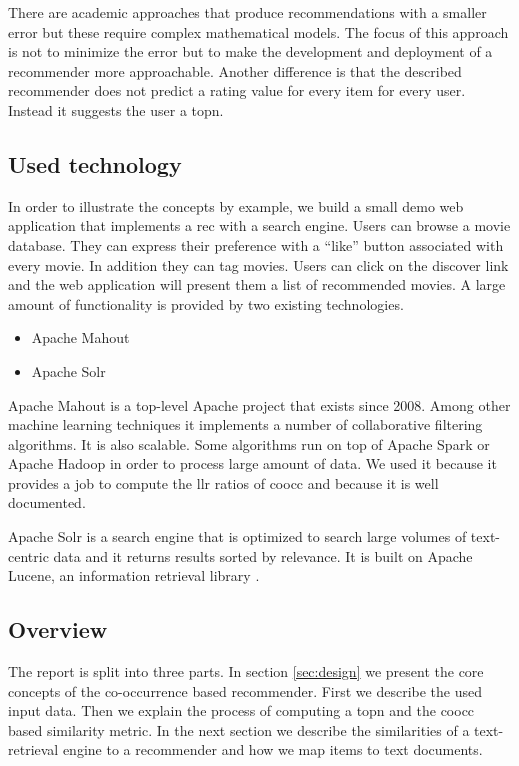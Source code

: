 There are academic approaches that produce recommendations with a smaller error but these require complex mathematical models. The focus of this approach is not to minimize the error but to make the development and deployment of a recommender more approachable. Another difference is that the described recommender does not predict a rating value for every item for every user. Instead it suggests the user a \gls{topn}.


\subsection{Used technology}
\label{sec:tech}

In order to illustrate the concepts by example, we build a small demo web application that implements a \gls{rec} with a search engine. Users can browse a movie database. They can express their preference with a ``like'' button associated with every movie. In addition they can tag movies. Users can click on the discover link and the web application will present them a list of recommended movies. A large amount of functionality is provided by two existing technologies.

\begin{itemize}
\item Apache Mahout
\item Apache Solr
\end{itemize}

Apache Mahout is a top-level Apache project that exists since 2008. Among other machine learning techniques it implements a number of collaborative filtering algorithms. It is also \gls{scalable}. Some algorithms run on top of Apache Spark or Apache Hadoop in order to process large amount of data\cite{Owen}. We used it because it provides a job to compute the \gls{llr} ratios of \gls{coocc} and because it is well documented.

Apache Solr is a search engine that is optimized to search large volumes of text-centric data and it returns results sorted by relevance. It is built on Apache Lucene, an information retrieval library \cite{grainger}.

\subsection{Overview}
The report is split into three parts.
In section \ref{sec:design} we present the core concepts of the co-occurrence based recommender. First we describe the used input data. Then we explain the process of computing a \gls{topn} and the \gls{coocc} based similarity metric. In the next section we describe the similarities of a text-retrieval engine to a recommender and how we map items to text documents.

